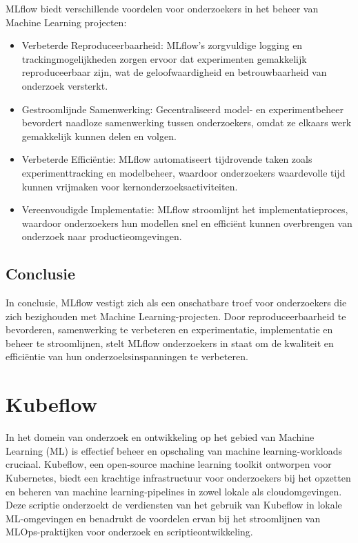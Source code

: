 MLflow biedt verschillende voordelen voor onderzoekers in het beheer van Machine Learning projecten:

\begin{itemize}
    \item Verbeterde Reproduceerbaarheid: MLflow's zorgvuldige logging en trackingmogelijkheden zorgen ervoor dat experimenten gemakkelijk reproduceerbaar zijn, wat de geloofwaardigheid en betrouwbaarheid van onderzoek versterkt.
    \item Gestroomlijnde Samenwerking: Gecentraliseerd model- en experimentbeheer bevordert naadloze samenwerking tussen onderzoekers, omdat ze elkaars werk gemakkelijk kunnen delen en volgen.
    \item Verbeterde Efficiëntie: MLflow automatiseert tijdrovende taken zoals experimenttracking en modelbeheer, waardoor onderzoekers waardevolle tijd kunnen vrijmaken voor kernonderzoeksactiviteiten.
    \item Vereenvoudigde Implementatie: MLflow stroomlijnt het implementatieproces, waardoor onderzoekers hun modellen snel en efficiënt kunnen overbrengen van onderzoek naar productieomgevingen.
\end{itemize}

\subsection{Conclusie}

In conclusie, MLflow vestigt zich als een onschatbare troef voor onderzoekers die zich bezighouden met Machine Learning-projecten. Door reproduceerbaarheid te bevorderen, samenwerking te verbeteren en experimentatie, implementatie en beheer te stroomlijnen, stelt MLflow onderzoekers in staat om de kwaliteit en efficiëntie van hun onderzoeksinspanningen te verbeteren.

\section{Kubeflow}

In het domein van onderzoek en ontwikkeling op het gebied van Machine Learning (ML) is effectief beheer en opschaling van machine learning-workloads cruciaal. Kubeflow, een open-source machine learning toolkit ontworpen voor Kubernetes, biedt een krachtige infrastructuur voor onderzoekers bij het opzetten en beheren van machine learning-pipelines in zowel lokale als cloudomgevingen. Deze scriptie onderzoekt de verdiensten van het gebruik van Kubeflow in lokale ML-omgevingen en benadrukt de voordelen ervan bij het stroomlijnen van MLOps-praktijken voor onderzoek en scriptieontwikkeling.

